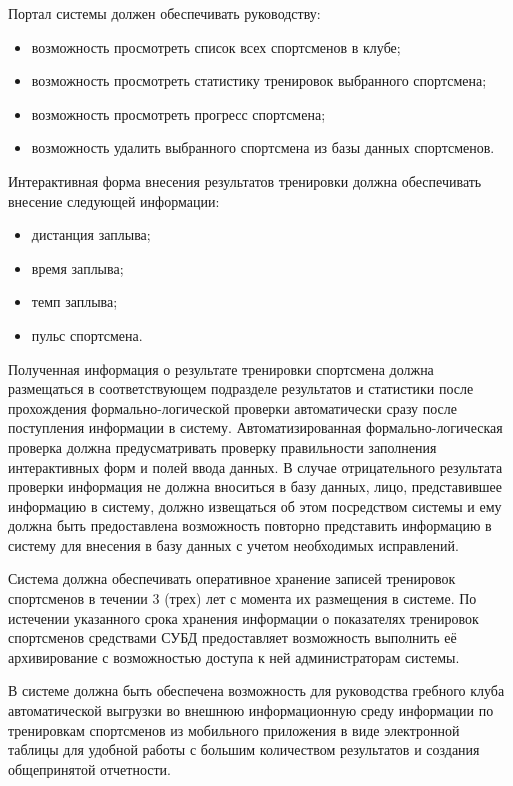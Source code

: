 \documentclass[14pt]{extreport}
\begin{document}
Портал системы должен обеспечивать руководству:
\begin{itemize}
\item возможность просмотреть список всех спортсменов в клубе;
\item возможность просмотреть статистику тренировок выбранного спортсмена;
\item возможность просмотреть прогресс спортсмена;
\item возможность удалить выбранного спортсмена из базы данных спортсменов.
\end{itemize}

Интерактивная форма внесения результатов тренировки должна обеспечивать внесение следующей информации:
\begin{itemize}
\item дистанция заплыва;
\item время заплыва;
\item темп заплыва;
\item пульс спортсмена.
\end{itemize}

Полученная информация о результате тренировки спортсмена должна размещаться в соответствующем подразделе результатов и статистики после прохождения формально-логической проверки автоматически сразу после поступления информации в систему. Автоматизированная формально-логическая проверка должна предусматривать проверку правильности заполнения интерактивных форм и полей ввода данных. В случае отрицательного результата проверки информация не должна вноситься в базу данных, лицо,
представившее информацию в систему, должно извещаться об этом
посредством системы и ему должна быть предоставлена возможность повторно
представить информацию в систему для внесения в базу данных с учетом
необходимых исправлений.

Система должна обеспечивать оперативное хранение записей тренировок спортсменов в течении 3 (трех) лет с момента их размещения в системе. По истечении указанного срока хранения информации о показателях тренировок спортсменов средствами СУБД предоставляет возможность выполнить её архивирование с возможностью доступа к ней администраторам системы.

В системе должна быть обеспечена возможность для руководства гребного клуба автоматической
выгрузки во внешнюю информационную среду информации по тренировкам спортсменов из мобильного приложения в виде электронной таблицы для удобной работы с большим количеством результатов и создания общепринятой отчетности.
\end{document}
